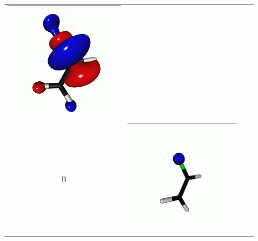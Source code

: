 \documentclass[journal=jctcce,manuscript=article]{achemso}
\begin{document}
\begin{table}[H]
\begin{tabular}{ c | c c c }
\begin{minipage}{0.2\textwidth}
         \includegraphics[scale=0.10]{NTO/CH2CHF/CH2CHF_F_1p.png}
     \end{minipage}
     \\
         B &  
     \begin{minipage}{0.2\textwidth}
         \centering
         \includegraphics[scale=0.10]{NTO/CH2CHF/CH2CHF_F_2h.png}

\end{minipage}
\end{tabular}
\end{table}
\end{document}
